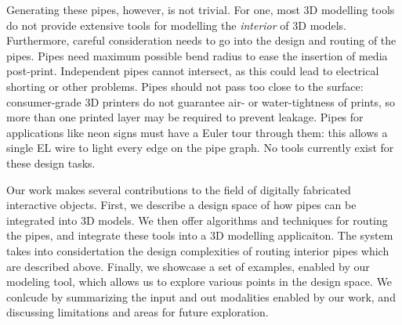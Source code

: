 Generating these pipes, however, is not trivial.  For one, most 3D modelling tools do not provide extensive tools for modelling the  {\em interior} of 3D models. Furthermore, careful consideration needs to go into the design and routing of the pipes. Pipes need maximum possible bend radius to ease the insertion of media post-print.  Independent pipes cannot intersect, as this could lead to electrical shorting or other problems.  Pipes should not pass too close to the surface: consumer-grade 3D printers do not guarantee air- or water-tightness of prints, so more than one printed layer may be required to prevent leakage.  Pipes for applications like neon signs must have a Euler tour through them: this allows a single EL wire to light every edge on the pipe graph.  No tools currently exist for these design tasks.  

Our work makes several contributions to the field of digitally fabricated interactive objects. First, we describe a design space of how pipes can be integrated into 3D models. We then offer algorithms and techniques for routing the pipes, and integrate these tools into  a 3D modelling applicaiton. The system takes into considertation the design complexities of routing interior pipes which are described above. Finally, we showcase a set of examples, enabled by our modeling tool, which allows us to explore various points in the design space. We conlcude by summarizing the input and out modalities enabled by our work, and discussing limitations and areas for future exploration. 
